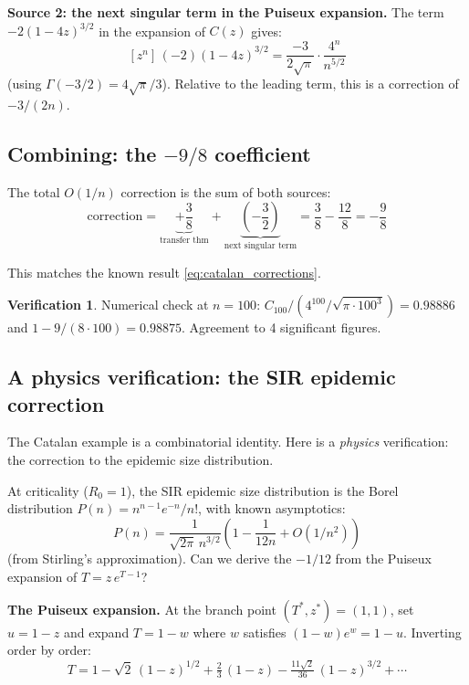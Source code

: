 \documentclass[11pt,a4paper]{article}
\theoremstyle{definition}
\newtheorem*{verification}{Verification}
\begin{document}
\textbf{Source 2: the next singular term in the Puiseux expansion.}
The term $-2(1{-}4z)^{3/2}$ in the expansion of $C(z)$ gives:
\[
[z^n]\, (-2)(1{-}4z)^{3/2} = \frac{-3}{2\sqrt{\pi}} \cdot \frac{4^n}{n^{5/2}}
\]
(using $\Gamma(-3/2) = 4\sqrt{\pi}/3$).
Relative to the leading term, this is a correction of $-3/(2n)$.

\subsection{Combining: the $-9/8$ coefficient}

The total $O(1/n)$ correction is the sum of both sources:
\begin{equation}
\boxed{\text{correction} = \underbrace{+\frac{3}{8}}_{\text{transfer thm}} +
\underbrace{\left(-\frac{3}{2}\right)}_{\text{next singular term}} =
\frac{3}{8} - \frac{12}{8} = -\frac{9}{8}}
\end{equation}

This matches the known result \eqref{eq:catalan_corrections}. \checkmark

\begin{verification}
Numerical check at $n = 100$:
$C_{100} / (4^{100}/\sqrt{\pi \cdot 100^3}) = 0.98886$
and $1 - 9/(8 \cdot 100) = 0.98875$.
Agreement to 4 significant figures. \checkmark
\end{verification}

\subsection{A physics verification: the SIR epidemic correction}

The Catalan example is a combinatorial identity. Here is a \emph{physics}
verification: the correction to the epidemic size distribution.

At criticality ($R_0 = 1$), the SIR epidemic size distribution is the
Borel distribution $P(n) = n^{n-1} e^{-n}/n!$, with known asymptotics:
\begin{equation}
P(n) = \frac{1}{\sqrt{2\pi}\, n^{3/2}}
\left(1 - \frac{1}{12n} + O(1/n^2)\right)
\label{eq:sir_correction}
\end{equation}
(from Stirling's approximation). Can we derive the $-1/12$ from the
Puiseux expansion of $T = z\, e^{T-1}$?

\textbf{The Puiseux expansion.}
At the branch point $(T^*, z^*) = (1, 1)$, set $u = 1 - z$ and expand
$T = 1 - w$ where $w$ satisfies $(1{-}w)e^w = 1 - u$. Inverting order
by order:
\[
T = 1 - \sqrt{2}\,(1{-}z)^{1/2} + \tfrac{2}{3}\,(1{-}z)
- \tfrac{11\sqrt{2}}{36}\,(1{-}z)^{3/2} + \cdots
\]
\end{document}
